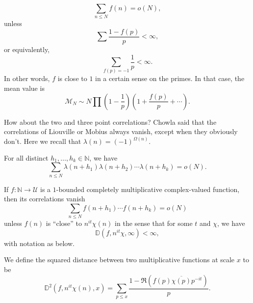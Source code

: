 \documentclass[reqno]{amsart} 
\begin{document}
\begin{equation*}
  \sum_{n \leq N} f (n ) = o (N),
\end{equation*}
unless
\begin{equation*}
  \sum \frac{1 - f (p)}{p} < \infty,
\end{equation*}
or equivalently,
\begin{equation*}
  \sum_{f (p) = - 1}
  \frac{1}{ p} < \infty.
\end{equation*}
In other words, $f$ is close to $1$ in a certain sense on the primes.  In that case, the mean value is
\begin{equation*}
  \mathcal{M}_N \sim N \prod \left( 1 - \frac{1}{p} \right) \left( 1 + \frac{f (p)}{p} + \dotsb \right).
\end{equation*}

How about the two and three point correlations?  Chowla said that the correlations of Liouville or Mobius always vanish, except when they obviously don't.  Here we recall that $\lambda (n) = (- 1 )^{\Omega (n)}$.
\begin{conjecture}[Chowla, 1964]
  For all distinct $h_1, \dotsc, h_k \in \mathbb{N}$, we have
  \begin{equation*}
    \sum_{n \leq N}
    \lambda (n + h_1 )
    \lambda (n + h_2 ) \dotsb
    \lambda (n + h_k )
    = o(N).
  \end{equation*}
\end{conjecture}
\begin{conjecture}[Elliott, 1994]
  If $f : \mathbb{N} \rightarrow \mathcal{U}$ is a $1$-bounded completely multiplicative complex-valued function, then its correlations vanish
  \begin{equation*}
    \sum_{n \leq N}
    f (n + h_1 ) \dotsb
    f (n + h_k ) =
    o(N)
  \end{equation*}
  unless $f(n)$ is ``close'' to $n^{i t} \chi (n)$ in the sense that for some $t$ and $\chi$, we have
  \begin{equation*}
    \mathbb{D} (f, n^{i t } \chi, \infty ) < \infty,
  \end{equation*}
  with notation as below.
\end{conjecture}
\begin{definition}
  We define the squared distance between two multiplicative functions at scale $x$ to be
  \begin{equation*}
    \mathbb{D}^2 (f , n^{i t } \chi (n), x)
    =
    \sum_{p \leq x}
    \frac{1 - \Re (f (p) \overline{\chi (p)} p^{- i t})}{p}.
  \end{equation*}
\end{definition}
\end{document}
